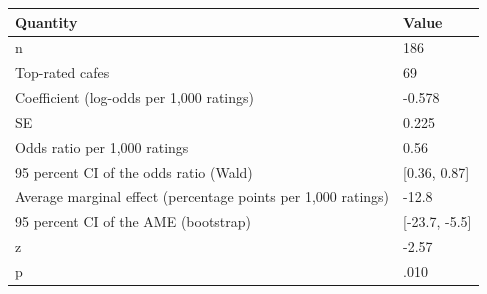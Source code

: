 \begin{table}[ht]
\centering
\begingroup\footnotesize
\begin{tabular}{ll}
  \toprule
Quantity & Value \\ 
  \midrule
n & 186 \\ 
  Top-rated cafes & 69 \\ 
  Coefficient (log-odds per 1,000 ratings) & -0.578 \\ 
  SE & 0.225 \\ 
  Odds ratio per 1,000 ratings & 0.56 \\ 
  95 percent CI of the odds ratio (Wald) & [0.36, 0.87] \\ 
  Average marginal effect (percentage points per 1,000 ratings) & -12.8 \\ 
  95 percent CI of the AME (bootstrap) & [-23.7, -5.5] \\ 
  z & -2.57 \\ 
  p & .010 \\ 
   \bottomrule
\end{tabular}
\endgroup
\end{table}
